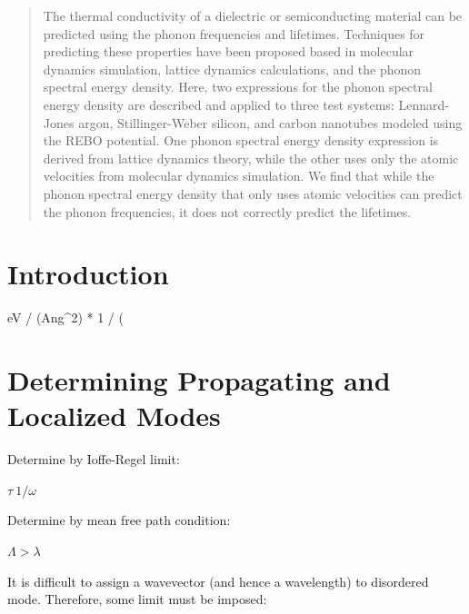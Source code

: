 \documentclass[aps,prb,preprint,superscriptaddress,amsmath,amssymb,floatfix]{revtex4}
\begin{document}
\begin{abstract}
The thermal conductivity of a dielectric or semiconducting material can be predicted using the phonon frequencies and lifetimes. Techniques for predicting these properties have been proposed based in molecular dynamics simulation, lattice dynamics calculations, and the phonon spectral energy density. Here, two expressions for the phonon spectral energy density are described and applied to three test systems: Lennard-Jones argon, Stillinger-Weber silicon, and carbon nanotubes modeled using the REBO potential. One phonon spectral energy density expression is derived from lattice dynamics theory, while the other uses only the atomic velocities from molecular dynamics simulation. We find that while the phonon spectral energy density that only uses atomic velocities can predict the phonon frequencies, it does not correctly predict the lifetimes.
\end{abstract}


\maketitle

\clearpage
\section{\label{S-Motivation}Introduction}

eV / (Ang^2) * 1 / (

\section{\label{S-Motivation}Determining Propagating and Localized Modes}

Determine by Ioffe-Regel limit:

$\tau ~ 1/\omega$

Determine by mean free path condition:

$\Lambda \gt \lambda$

It is difficult to assign a wavevector (and hence a wavelength) to disordered mode.  Therefore, some limit must be imposed:
\end{document}
